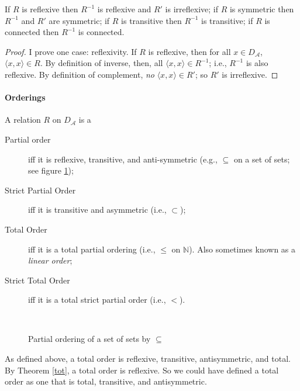 \begin{theorem}
	If $R$ is reflexive then $R^{-1}$ is reflexive and $R'$ is irreflexive; if $R$ is symmetric then $R^{-1}$ and $R'$ are symmetric; if $R$ is transitive then $R^{-1}$ is transitive; if $R$ is connected then $R^{-1}$ is connected.
\begin{proof}
	I prove one case: reflexivity. If $R$ is reflexive, then for all $x \in D_{\mathscr{A}}$, $\langle x,x\rangle \in R$. By definition of inverse, then, all $\langle x,x\rangle \in R^{-1}$; i.e., $R^{-1}$ is also reflexive.  By definition of complement, \emph{no} $\langle x,x\rangle \in R'$; so $R'$ is irreflexive.
\end{proof}\end{theorem}



\paragraph{Orderings}
\begin{definition}[Ordering]
	A relation $R$ on $D_{\mathscr{A}}$ is a \begin{description}
		\item [Partial order] iff it is reflexive, transitive, and anti-symmetric (e.g., $\subseteq$ on a set of sets; see figure \ref{fthree});
		\item [Strict Partial Order] iff it is transitive and asymmetric (i.e., $\subset$);
		\item [Total Order] iff it is a total partial ordering (i.e., $\leqslant$ on $\mathbb{N}$). Also sometimes known as a \emph{linear order};
		\item [Strict Total Order] iff it is a total strict partial order (i.e., $<$).
	\end{description} 
\end{definition}

\begin{figure}
	\centering ~{
	}\caption{Partial ordering of a set of sets by $\subseteq$\label{fthree}}
\end{figure}

As defined above, a total order is reflexive, transitive, antisymmetric, and total. By Theorem \ref{tot}, a total order is reflexive. So we could have defined a total order as one that is total, transitive, and antisymmetric.


